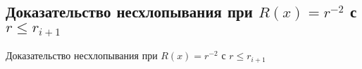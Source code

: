 \subsection{\texorpdfstring{Доказательство несхлопывания при $R(x)=r^{-2}$ с $r\leq r_{i+1}$}{Доказательство несхлопывания при R(x) = r−2 с r ≤ ri+1}}

Доказательство несхлопывания при $R(x)=r^{-2}$ с $r \leq r_{i+1}$